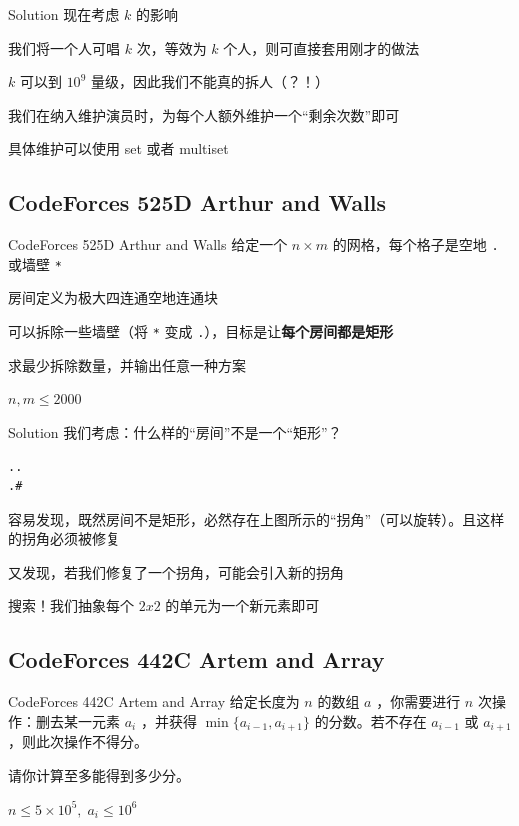 ﻿\documentclass[aspectratio=169,handout]{ctexbeamer}
\begin{document}
\begin{frame}{Solution}
    现在考虑 $k$ 的影响
    \pause

    我们将一个人可唱 $k$ 次，等效为 $k$ 个人，则可直接套用刚才的做法
    \pause

    $k$ 可以到 $10^9$ 量级，因此我们不能真的拆人（？！）
    \pause

    我们在纳入维护演员时，为每个人额外维护一个“剩余次数”即可
    \pause

    具体维护可以使用 set 或者 multiset
\end{frame}












\subsection{CodeForces 525D Arthur and Walls}
\begin{frame}{CodeForces 525D Arthur and Walls}
    给定一个 $n\times m$ 的网格，每个格子是空地 \texttt{.} 或墙壁 \texttt{*}

房间定义为极大四连通空地连通块

可以拆除一些墙壁（将 \texttt{*} 变成 \texttt{.}），目标是让\textbf{每个房间都是矩形}

求最少拆除数量，并输出任意一种方案

$n,m\leq 2000$
\end{frame}

\begin{frame}[fragile]{Solution}
    我们考虑：什么样的“房间”不是一个“矩形”？
    \pause
    \begin{verbatim}
..
.#
    \end{verbatim}
    容易发现，既然房间不是矩形，必然存在上图所示的“拐角”（可以旋转）。且这样的拐角\textcolor{peaking}{必须被修复}
    \pause

    又发现，若我们修复了一个拐角，可能会引入新的拐角
    
    搜索！我们抽象每个 $2x2$ 的单元为一个新元素即可


\end{frame}












\subsection{CodeForces 442C Artem and Array}
\begin{frame}{CodeForces 442C Artem and Array}
    给定长度为 $n$ 的数组 $a$ ，你需要进行 $n$ 次操作：删去某一元素 $a_i$ ，并获得 $\min\{a_{i-1}, a_{i+1}\}$ 的分数。若不存在 $a_{i-1}$ 或 $a_{i+1}$，则此次操作不得分。

    请你计算至多能得到多少分。

    $n\leq 5\times 10^5,\; a_i\leq 10^6$
\end{frame}
\end{document}
